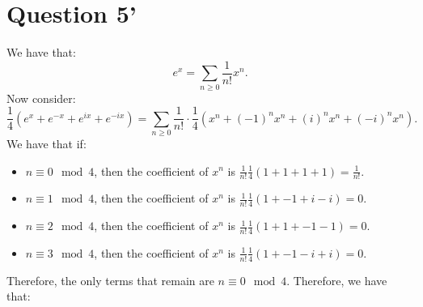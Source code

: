 \documentclass[]{article}
\begin{document}
\section{Question 5'}
We have that:
\begin{equation}
	e^x = \sum_{n \geq 0} \frac{1}{n!}x^n.
\end{equation}
Now consider:
\begin{equation}
	\frac{1}{4} \left(e^x + e^{-x} + e^{ix} + e^{-ix} \right) = \sum_{n \geq 0} \frac{1}{n!} \cdot \frac{1}{4} \left(x^n + (-1)^n x^n + (i)^n x^n + (-i)^n x^n\right).
\end{equation}
We have that if: 
\begin{itemize}
	\item $n \equiv 0 \mod 4$, then the coefficient of $x^n$ is $\frac{1}{n!}\frac{1}{4} \left(1 + 1 + 1 + 1\right) = \frac{1}{n!}$. 
	\item $n \equiv 1 \mod 4$, then the coefficient of $x^n$ is $\frac{1}{n!}\frac{1}{4} \left(1 + -1 + i -i \right) = 0$. 
	\item $n \equiv 2 \mod 4$, then the coefficient of $x^n$ is $\frac{1}{n!}\frac{1}{4} \left(1 + 1 + -1 -1 \right) = 0$. 
	\item $n \equiv 3 \mod 4$, then the coefficient of $x^n$ is $\frac{1}{n!}\frac{1}{4} \left(1 + -1 -i + i \right) = 0$. 
\end{itemize}
Therefore, the only terms that remain are $n \equiv 0 \mod 4$. Therefore, we have that:
\end{document}
